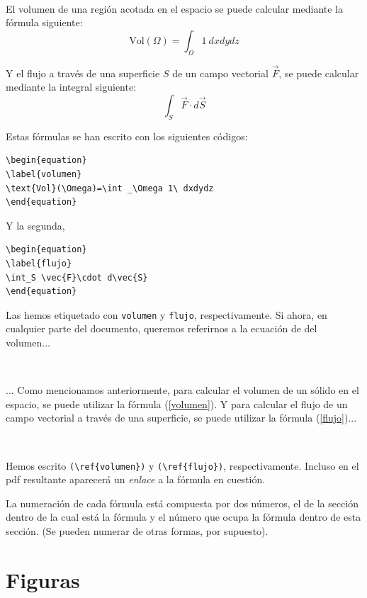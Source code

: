 \documentclass[a4paper,12pt]{article}
\begin{document}
{\

El volumen de una región acotada en  el espacio se puede calcular mediante la fórmula siguiente:
\begin{equation}
\label{volumen}
\text{Vol}(\Omega)=\int _\Omega 1\ dxdydz
\end{equation}

Y el flujo a través de una superficie $S$ de un campo vectorial $\vec{F}$, se puede calcular mediante la integral siguiente:
\begin{equation}
\label{flujo}
\int_S \vec{F}\cdot d\vec{S}
\end{equation}

Estas fórmulas se han escrito con los siguientes códigos:

\begin{verbatim}
\begin{equation}
\label{volumen}
\text{Vol}(\Omega)=\int _\Omega 1\ dxdydz
\end{equation}
\end{verbatim}

Y la segunda,

\begin{verbatim}
\begin{equation}
\label{flujo}
\int_S \vec{F}\cdot d\vec{S}
\end{equation}
\end{verbatim}

Las hemos etiquetado con \verb|volumen| y \verb|flujo|, respectivamente. Si ahora, en cualquier parte del documento, queremos referirnos a la ecuación de del volumen...

\

... Como mencionamos anteriormente, para calcular el volumen de un sólido en el espacio, se puede utilizar la fórmula (\ref{volumen}). Y para calcular el flujo de un campo vectorial a través de una superficie, se puede utilizar la fórmula (\ref{flujo})...

\

Hemos escrito \verb|(\ref{volumen})| y \verb|(\ref{flujo})|, respectivamente. Incluso en el pdf resultante aparecerá un \textsl{enlace} a la fórmula en cuestión.

La numeración de cada fórmula está compuesta por dos números, el de la sección dentro de la cual está la fórmula y el número que ocupa la fórmula dentro de esta sección. (Se pueden numerar de otras formas, por supuesto).



\section{Figuras}


}
\end{document}
